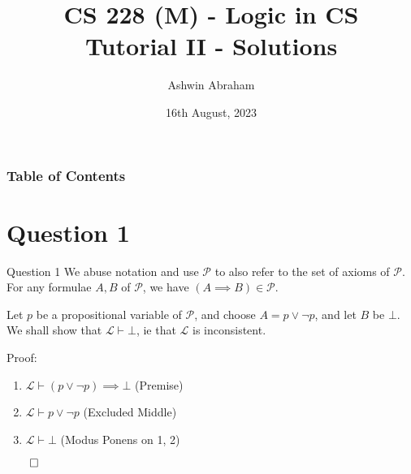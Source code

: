 \documentclass{beamer}
\title[] 
{\textbf{CS 228 (M) - Logic in CS}\\Tutorial II - Solutions}
\author[Ashwin Abraham] 
{Ashwin Abraham}
\institute[] 
{
    IIT Bombay
}
\date[2023]
{16th August, 2023}
\begin{document}
    \frame{\titlepage}

    \begin{frame}
        \frametitle{Table of Contents}
        \tableofcontents    
    \end{frame}

    \section{Question 1}
    {
        \begin{frame}{Question 1}
            We abuse notation and use $\mathcal{P}$ to also refer to the set of axioms of $\mathcal{P}$. For any formulae $A, B$ of $\mathcal{P}$, we have $(A \implies B) \in \mathcal{P}$. 
            
            Let $p$ be a propositional variable of $\mathcal{P}$, and choose $A = p \lor \neg p$, and let $B$ be $\bot$. We shall show that $\mathcal{L} \vdash \bot$, ie that $\mathcal{L}$ is inconsistent. 

            Proof:
            \begin{enumerate}
                \item $\mathcal{L} \vdash (p \lor \neg p) \implies \bot$ (Premise)
                \item $\mathcal{L} \vdash p \lor \neg p$ (Excluded Middle)
                \item $\mathcal{L} \vdash \bot$ (Modus Ponens on 1, 2)
            \end{enumerate}
            $\qed$
        \end{frame}
    }
\end{document}
